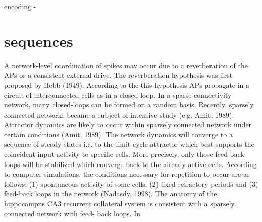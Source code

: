 \documentclass{article}
\begin{document}
encoding - 

\section*{sequences}
A network-level coordination of spikes may occur due to a reverberation of the APs or a consistent external drive. The reverberation hypothesis was first proposed by Hebb (1949). According to the this hypothesis APs propagate in a circuit of interconnected cells as in a closed-loop. In a sparse-connectivity network, many closed-loops can be formed on a random basis. Recently, sparsely connected networks became a subject of intensive study (e.g. Amit, 1989). Attractor dynamics are likely to occur within sparsely connected network under certain conditions (Amit, 1989). The network dynamics will converge to a sequence of steady states i.e. to the limit cycle attractor which best supports the coincident input activity to specific cells. More precisely, only those feed-back loops will be stabilized which converge back to the already active cells. According to computer simulations, the conditions necessary for repetition to occur are as follows: (1) spontaneous activity of some cells, (2) fixed refractory periods and (3) feed-back loops in the network (Nadasdy, 1998). The anatomy of the hippocampus CA3 recurrent collateral system is consistent with a sparsely connected network with feed- back loops. In
\end{document}

